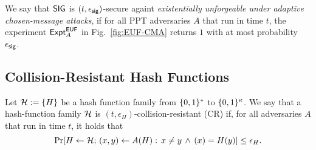 \begin{definition}
We say that $\mathsf{SIG}$ is $(t, \epsilon_{\mathsf{sig}})$-secure
againt \textit{existentially unforgeable under
adaptive chosen-message attacks}, if for all PPT
adversaries $A$ that run in time $t$, the experiment
$\mathsf{Expt}^{\sf EUF}_{A}$ in Fig.~\ref{fig:EUF-CMA} returns
$1$ with at most probability $\epsilon_{\sf sig}$.

\begin{figure*}[!htb]
\begin{center}
\caption{EUF-CMA security experiment}\label{fig:EUF-CMA}
\end{center}
\end{figure*}

\end{definition}

\subsection{Collision-Resistant Hash Functions} \label{sec:CRH}
Let $\mathcal{H}:= \{H\}$ be a hash function family from
$\{0,1\}^*$ to $\{0,1\}^{\kappa}$.
We say that a hash-function family $\mathcal{H}$ is
$(t,\epsilon_{H})$-collision-resistant (CR) if, for all
adversaries $A$ that run in time $t$, it holds that
\begin{equation}
 \Pr[H \gets {\mathcal{H}}; \, (x,y) \gets A(H): \, x \neq y
 \, \wedge \,(x) = H(y)] \leq \epsilon_{H}.
\end{equation}

